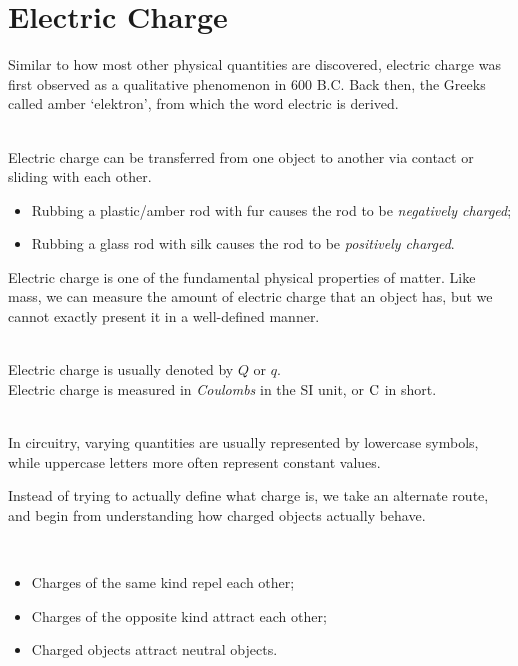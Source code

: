 \section{Electric Charge}
Similar to how most other physical quantities are discovered, electric charge was first observed as a qualitative phenomenon in 600 B.C. Back then, the Greeks called amber `elektron', from which the word electric is derived.
\begin{property}
    \ \\Electric charge can be transferred from one object to another via contact or sliding with each other.
    \begin{itemize}
        \item Rubbing a plastic/amber rod with fur causes the rod to be \emph{negatively charged};
        \item Rubbing a glass rod with silk causes the rod to be \emph{positively charged}. 
    \end{itemize}
    \label{property-triboelectric-effect}
\end{property}
Electric charge is one of the fundamental physical properties of matter. Like mass, we can measure the amount of electric charge that an object has, but we cannot exactly present it in a well-defined manner. 
\begin{notation}
    \ \\Electric charge is usually denoted by $Q$ or $q$.\\
    Electric charge is measured in \emph{Coulombs} in the SI unit, or $\rm{C}$ in short.
\end{notation}
\vspace{-12pt}
\begin{remark}
    \ \\In circuitry, varying quantities are usually represented by lowercase symbols, while uppercase letters more often represent constant values.
\end{remark}
Instead of trying to actually define what charge is, we take an alternate route, and begin from understanding how charged objects actually behave.
\begin{property}
    \ \begin{itemize}
        \item Charges of the same kind repel each other;
        \item Charges of the opposite kind attract each other;
        \item Charged objects attract neutral objects.
    \end{itemize}
\end{property}
